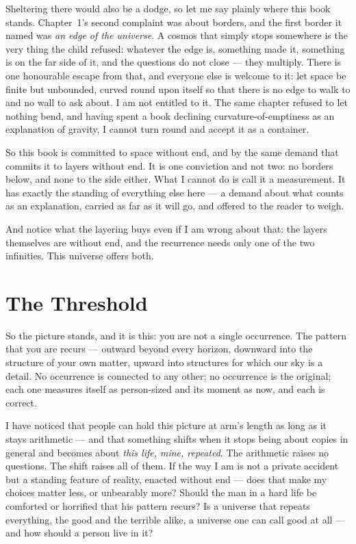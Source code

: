 \documentclass[fontsize=11pt,paper=a4,pagesize=auto,parskip=half-]{scrbook}
\begin{document}
Sheltering there would also be a dodge, so let me say plainly where this book stands. Chapter~1's second complaint was about borders, and the first border it named was \emph{an edge of the universe}. A cosmos that simply stops somewhere is the very thing the child refused: whatever the edge is, something made it, something is on the far side of it, and the questions do not close --- they multiply. There is one honourable escape from that, and everyone else is welcome to it: let space be finite but unbounded, curved round upon itself so that there is no edge to walk to and no wall to ask about. I am not entitled to it. The same chapter refused to let nothing bend, and having spent a book declining curvature-of-emptiness as an explanation of gravity, I cannot turn round and accept it as a container.

So this book is committed to space without end, and by the same demand that commits it to layers without end. It is one conviction and not two: no borders below, and none to the side either. What I cannot do is call it a measurement. It has exactly the standing of everything else here --- a demand about what counts as an explanation, carried as far as it will go, and offered to the reader to weigh.

And notice what the layering buys even if I am wrong about that: the layers themselves are without end, and the recurrence needs only one of the two infinities. This universe offers both.

\section{The Threshold}

So the picture stands, and it is this: you are not a single occurrence. The pattern that you are recurs --- outward beyond every horizon, downward into the structure of your own matter, upward into structures for which our sky is a detail. No occurrence is connected to any other; no occurrence is the original; each one measures itself as person-sized and its moment as now, and each is correct.

I have noticed that people can hold this picture at arm's length as long as it stays arithmetic --- and that something shifts when it stops being about copies in general and becomes about \emph{this life, mine, repeated}. The arithmetic raises no questions. The shift raises all of them. If the way I am is not a private accident but a standing feature of reality, enacted without end --- does that make my choices matter less, or unbearably more? Should the man in a hard life be comforted or horrified that his pattern recurs? Is a universe that repeats everything, the good and the terrible alike, a universe one can call good at all --- and how should a person live in it?
\end{document}
